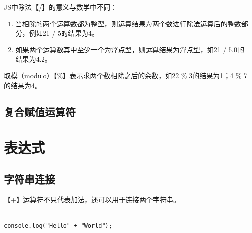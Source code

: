 JS中除法【/】的意义与数学中不同：

\begin{enumerate}
	\item 当相除的两个运算数都为整型，则运算结果为两个数进行除法运算后的整数部分，例如21 / 5的结果为4。

	\item 如果两个运算数其中至少一个为浮点型，则运算结果为浮点型，如21 / 5.0的结果为4.2。
\end{enumerate}

取模（modulo）【\%】表示求两个数相除之后的余数，如22 \% 3的结果为1；4 \% 7的结果为4。

\subsection{复合赋值运算符}

\begin{table}[H]
	\centering
	\caption{复合赋值运算符}
\end{table}

\newpage

\section{表达式}

\subsection{字符串连接}

【+】运算符不只代表加法，还可以用于连接两个字符串。 \\

 \\

\begin{lstlisting}[style=htmlcssjs]
console.log("Hello" + "World");
\end{lstlisting}

